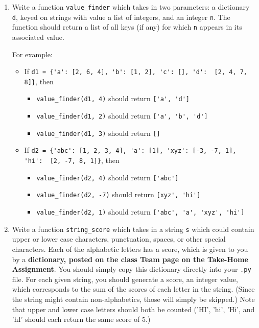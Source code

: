 \documentclass{article}
\begin{document}
\begin{enumerate}

\item Write a function \verb|value_finder| which takes in two parameters: a dictionary \verb|d|, keyed on strings with value a list of integers, and an integer \verb|n|. The function should return a list of all keys (if any) for which \verb|n| appears in its associated value.

    For example:

    \begin{itemize}
      \item If \verb|d1 = {'a': [2, 6, 4], 'b': [1, 2], 'c': [], 'd':  [2, 4, 7, 8]}|, then
      \begin{itemize}
        \item \verb|value_finder(d1, 4)| should return \verb|['a', 'd']|
        \item \verb|value_finder(d1, 2)| should return \verb|['a', 'b', 'd']|
        \item \verb|value_finder(d1, 3)| should return \verb|[]|
      \end{itemize}
      \item If \verb|d2 = {'abc': [1, 2, 3, 4], 'a': [1], 'xyz': [-3, -7, 1], 'hi':  [2, -7, 8, 1]}|, then
      \begin{itemize}
        \item \verb|value_finder(d2, 4)| should return \verb|['abc']|
        \item \verb|value_finder(d2, -7)| should return \verb|[xyz', 'hi']|
        \item \verb|value_finder(d2, 1)| should return \verb|['abc', 'a', 'xyz', 'hi']|
      \end{itemize}
    \end{itemize}

\item Write a function \verb|string_score| which takes in a string
  \verb|s| which could contain upper or lower case characters,
  punctuation, spaces, or other special characters. Each of the
  alphabetic letters has a score, which is given to you by a
  \textbf{dictionary, posted on the class Team page on the Take-Home Assignment}. You should simply
  copy this dictionary directly into your \verb|.py| file. For each given string, you should generate a score, an integer value, which corresponds to the sum of the scores of each letter in the string. (Since the string might contain non-alphabetics, those will simply be skipped.) Note that upper and lower case letters should both be counted ('HI', 'hi', 'Hi', and 'hI' should each return the same score of 5.)


\end{enumerate}
\end{document}
